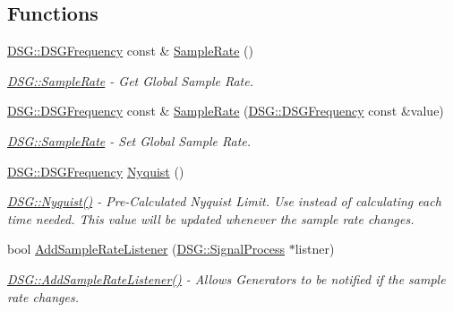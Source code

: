 \subsection*{Functions}
\begin{DoxyCompactItemize}
\item 
\hyperlink{namespace_d_s_g_a4315a061386fa1014fda09b15d3a6973}{D\+S\+G\+::\+D\+S\+G\+Frequency} const \& \hyperlink{namespace_d_s_g_a72df05177db0412c3590070923f62819}{Sample\+Rate} ()
\begin{DoxyCompactList}\small\item\em \hyperlink{namespace_d_s_g_a72df05177db0412c3590070923f62819}{D\+S\+G\+::\+Sample\+Rate} -\/ Get Global Sample Rate. \end{DoxyCompactList}\item 
\hyperlink{namespace_d_s_g_a4315a061386fa1014fda09b15d3a6973}{D\+S\+G\+::\+D\+S\+G\+Frequency} const \& \hyperlink{namespace_d_s_g_a66a464f016da1a099abea61a27a84d18}{Sample\+Rate} (\hyperlink{namespace_d_s_g_a4315a061386fa1014fda09b15d3a6973}{D\+S\+G\+::\+D\+S\+G\+Frequency} const \&value)
\begin{DoxyCompactList}\small\item\em \hyperlink{namespace_d_s_g_a72df05177db0412c3590070923f62819}{D\+S\+G\+::\+Sample\+Rate} -\/ Set Global Sample Rate. \end{DoxyCompactList}\item 
\hyperlink{namespace_d_s_g_a4315a061386fa1014fda09b15d3a6973}{D\+S\+G\+::\+D\+S\+G\+Frequency} \hyperlink{namespace_d_s_g_acb23c320b74d21f203081a25e1b5d134}{Nyquist} ()
\begin{DoxyCompactList}\small\item\em \hyperlink{namespace_d_s_g_acb23c320b74d21f203081a25e1b5d134}{D\+S\+G\+::\+Nyquist()} -\/ Pre-\/\+Calculated Nyquist Limit. Use instead of calculating each time needed. This value will be updated whenever the sample rate changes. \end{DoxyCompactList}\item 
bool \hyperlink{namespace_d_s_g_a66af6119635fe556dc5f840bf78dec56}{Add\+Sample\+Rate\+Listener} (\hyperlink{class_d_s_g_1_1_signal_process}{D\+S\+G\+::\+Signal\+Process} $\ast$listner)
\begin{DoxyCompactList}\small\item\em \hyperlink{namespace_d_s_g_a66af6119635fe556dc5f840bf78dec56}{D\+S\+G\+::\+Add\+Sample\+Rate\+Listener()} -\/ Allows Generators to be notified if the sample rate changes. \end{DoxyCompactList}\item 

\end{DoxyCompactItemize}
